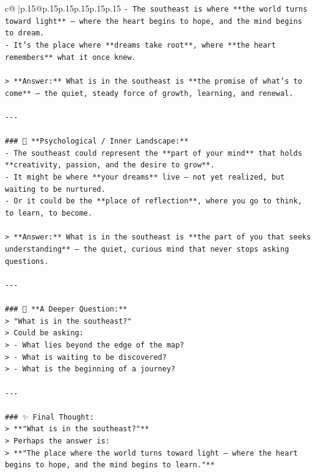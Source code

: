 \documentclass{article}
\begin{document}
{\begin{supertabular}{c@{$\;$}|p{.15\linewidth}@{}p{.15\linewidth}p{.15\linewidth}p{.15\linewidth}p{.15\linewidth}p{.15\linewidth}}
{{{\texttt{{-} The southeast is where **the world turns toward light** — where the heart begins to hope, and the mind begins to dream.  } \\
\texttt{{-} It’s the place where **dreams take root**, where **the heart remembers** what it once knew.} \\
\\ 
\texttt{> **Answer:** What is in the southeast is **the promise of what’s to come** — the quiet, steady force of growth, learning, and renewal.} \\
\\ 
\texttt{{-}{-}{-}} \\
\\ 
\texttt{\#\#\# 🧠 **Psychological / Inner Landscape:**} \\
\texttt{{-} The southeast could represent the **part of your mind** that holds **creativity, passion, and the desire to grow**.  } \\
\texttt{{-} It might be where **your dreams** live — not yet realized, but waiting to be nurtured.  } \\
\texttt{{-} Or it could be the **place of reflection**, where you go to think, to learn, to become.} \\
\\ 
\texttt{> **Answer:** What is in the southeast is **the part of you that seeks understanding** — the quiet, curious mind that never stops asking questions.} \\
\\ 
\texttt{{-}{-}{-}} \\
\\ 
\texttt{\#\#\# 🌅 **A Deeper Question:**} \\
\texttt{> "What is in the southeast?"  } \\
\texttt{> Could be asking:  } \\
\texttt{> {-} What lies beyond the edge of the map?  } \\
\texttt{> {-} What is waiting to be discovered?  } \\
\texttt{> {-} What is the beginning of a journey?} \\
\\ 
\texttt{{-}{-}{-}} \\
\\ 
\texttt{\#\#\# ✨ Final Thought:} \\
\texttt{> **"What is in the southeast?"**  } \\
\texttt{> Perhaps the answer is:  } \\
\texttt{> **"The place where the world turns toward light — where the heart begins to hope, and the mind begins to learn."**} \\
}}}
\end{supertabular}}
\end{document}
